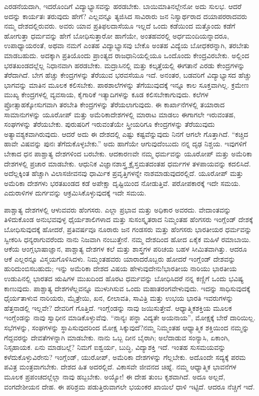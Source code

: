 ಎರಡನೆಯದಾಗಿ, ಇದರೊಂದಿಗೆ ವಿದ್ಯಾಭ್ಯಾಸವನ್ನು ಹರಡಬೇಕು. ಬಾಯಿಮಾತಿನಲ್ಲೇನೋ ಅದು ಸುಲಭ. ಆದರೆ ಅದನ್ನು ಕಾರ್ಯತಃ ತರುವುದು ಹೇಗೆ? ಎಲ್ಲವನ್ನೂ ತ್ಯಜಿಸಿದ ಸಾವಿರಾರು ಜನ ನಿಸ್ವಾರ್ಥರಾದ ದಯಾಪರರಾದವರು ನಮ್ಮ ದೇಶದಲ್ಲಿರುವರು. ಅವರು ಯಾವ ಪ್ರತಿಫಲದಾಸೆಯೂ ಇಲ್ಲದೆ ಒಂದು ಕಡೆಯಿಂದ ಮತ್ತೊಂದು ಕಡೆಗೆ ಹೋಗುತ್ತಾ ಧರ್ಮವನ್ನು ಹೇಗೆ ಬೋಧಿಸುತ್ತಾರೋ ಹಾಗೆಯೇ, ಅಂತಹವರಲ್ಲಿ ಅರ್ಧಮಂದಿಯನ್ನಾದರೂ, ಉಪಾಧ್ಯಾಯರಂತೆ, ಅಥವಾ ನಮಗೆ ಎಂತಹ ವಿದ್ಯಾಭ್ಯಾಸವು ಬೇಕೊ ಅಂತಹ ವಿದ್ಯೆಯ ಬೋಧಕರನ್ನಾಗಿ, ತರಬೇತು ಮಾಡಬಹುದು. ಅದಕ್ಕಾಗಿ ಪ್ರತಿಯೊಂದು ಪ್ರಾಂತ್ಯದ ರಾಜಧಾನಿಯಲ್ಲಿಯೂ ಒಂದೊಂದು ಕೇಂದ್ರವಿರಬೇಕು. ಅಲ್ಲಿಂದ ಭರತಖಂಡದಲ್ಲೆಲ್ಲ ನಿಧಾನವಾಗಿ ಹರಡಬೇಕು. ಮದ್ರಾಸಿನಲ್ಲಿ ಮತ್ತು ಕಲ್ಕತ್ತೆಯಲ್ಲಿ ಈಗತಾನೆ ಎರಡು ಕೇಂದ್ರಗಳನ್ನು ತೆರೆದಾಗಿದೆ. ಬೇಗ ಹೆಚ್ಚು ಕೇಂದ್ರಗಳನ್ನು ತೆರೆಯುವ ಭರವಸೆಯೂ ಇದೆ. ಅನಂತರ, ಬಡವರಿಗೆ ವಿದ್ಯಾಭ್ಯಾಸದ ಹೆಚ್ಚು ಭಾಗವನ್ನು ಮಾತಿನ ಮೂಲಕ ಕಲಿಸಬೇಕು. ಪಾಠಶಾಲೆಗಳನ್ನು ತೆಗೆಯುವುದಕ್ಕೆ ಇನ್ನೂ ಕಾಲ ಸೂಕ್ತವಾಗಿಲ್ಲ. ಕ್ರಮೇಣ ಮುಖ್ಯ ಕೇಂದ್ರಗಳಲ್ಲಿ ವ್ಯವಸಾಯ, ಕೈಗಾರಿಕೆ ಇತ್ಯಾದಿಗಳನ್ನು ಕೂಡ ಕಲಿಸಬೇಕಾಗುವುದು. ಕಲೆಗಳ ಪ್ರೋತ್ಸಾಹಕ್ಕೋಸುಗವಾಗಿ ತರಬೇತಿ ಕೇಂದ್ರಗಳನ್ನು ತೆರೆಯಲಾಗುವುದು. ಈ ಕಾರ್ಖಾನೆಗಳಲ್ಲಿ ತಯಾರಾದ ಸಾಮಾನುಗಳನ್ನು ಯೂರೋಪ್ ಮತ್ತು ಅಮೆರಿಕಾದೇಶಗಳಲ್ಲಿ ಮಾರಾಟ ಮಾಡಲು ಈಗಾಗಲೇ ಇರುವಂತಹ, ಸಂಘಗಳನ್ನು ತೆರೆಯಬೇಕು. ಪುರುಷರಿಗೆ ಇರುವಂತೆಯೇ ಸ್ತ್ರೀಯರಿಗೂ ಕೇಂದ್ರಗಳನ್ನು ತೆರೆಯುವುದು ಅತ್ಯಾವಶ್ಯಕವಾಗಿರುವುದು. ಆದರೆ ಅದು ಈ ದೇಶದಲ್ಲಿ ಎಷ್ಟು ಕಷ್ಟವೆನ್ನುವುದು ನಿನಗೆ ಆಗಲೇ ಗೊತ್ತಾಗಿದೆ. “ಕಚ್ಚಿದ ಹಾವೇ ವಿಷವನ್ನು ಪುನಃ ತೆಗೆದುಕೊಳ್ಳಬೇಕು.” ಅದು ಹಾಗೆಯೇ ಆಗುವುದೆಂಬುದು ನನ್ನ ದೃಢ ನಿಶ್ಚಯ. ಇವುಗಳಿಗೆ ಬೇಕಾದ ಧನ ಪಾಶ್ಚಾತ್ಯ ದೇಶಗಳಿಂದ ಬರಬೇಕು. ಆದಕಾರಣವೇ ನಮ್ಮ ಧರ್ಮವನ್ನು ಯೂರೋಪ್ ಮತ್ತು ಅಮೆರಿಕಾ ದೇಶಗಳಲ್ಲಿ ಪ್ರಚಾರ ಮಾಡಬೇಕು. ಆಧುನಿಕ ವಿಜ್ಞಾನಶಾಸ್ತ್ರ ಕ್ರೈಸ್ತಮತದಂತಹ ಧರ್ಮಗಳ ತಳಪಾಯವನ್ನು ಕದಲಿಸಿದೆ. ಅದೆಲ್ಲಕ್ಕಿಂತ ಹೆಚ್ಚಾಗಿ ವಿಲಾಸಜೀವನವು ಧಾರ್ಮಿಕ ಪ್ರವೃತ್ತಿಗಳನ್ನೇ ನಾಶಮಾಡುವುದರಲ್ಲಿದೆ. ಯೂರೋಪ್ ಮತ್ತು ಅಮೆರಿಕಾ ದೇಶಗಳು ಭರತಖಂಡದ ಕಡೆ ಅಪೇಕ್ಷಾ ದೃಷ್ಟಿಯಿಂದ ನೋಡುತ್ತಿವೆ. ಪರೋಪಕಾರಕ್ಕೆ ಇದೇ ಸಮಯ. ಎದುರಾಳಿಗಳ ದುರ್ಗವನ್ನು ಆಕ್ರಮಿಸಿಕೊಳ್ಳುವುದಕ್ಕೆ ಇದೇ ಸಮಯ.

ಪಾಶ್ಚಾತ್ಯ ದೇಶಗಳಲ್ಲಿ ಆಳುವವರು ಹೆಂಗಸರು. ಎಲ್ಲಾ ಪ್ರಭಾವ ಮತ್ತು ಅಧಿಕಾರ ಅವರದು. ವೇದಾಂತವನ್ನು ತಿಳಿದುಕೊಂಡ ಅನುಭವವುಳ್ಳ ಧೈರ್ಯಶಾಲಿಗಳಾದ ಮತ್ತು ಸುಸಂಸ್ಕೃತರಾದ ನಿಮ್ಮಂತಹ ಹೆಂಗಸರು ಇಂಗ್ಲೆಂಡ್ ದೇಶಕ್ಕೆ ಬೋಧಿಸುವುದಕ್ಕೆ ಹೋದರೆ, ಪ್ರತಿವರ್ಷವೂ ನೂರಾರು ಜನ ಗಂಡಸರು ಮತ್ತು ಹೆಂಗಸರು ಭಾರತೀಯರ ಧರ್ಮವನ್ನು ಸ್ವೀಕರಿಸಿ ಧನ್ಯರಾಗುವರೆಂದು ನಾನು ನಿಜವಾಗಿ ನಂಬುತ್ತೇನೆ. ನಮ್ಮ ದೇಶದಿಂದ ಹೋದ ಏಕೈಕ ಮಹಿಳೆ ರಮಾಬಾಯಿ. ಆಕೆಯ ಆಂಗ್ಲಭಾಷಾಜ್ಞಾನ, ಪಾಶ್ಚಾತ್ಯ ದೇಶಗಳ ಕಲೆ ಮತ್ತು ಶಾಸ್ತ್ರಗಳ ಪರಿಚಯ ಬಹಳ ಸೀಮಿತವಾಗಿತ್ತು. ಆದರೂ ಆಕೆ ಎಲ್ಲರನ್ನೂ ವಿಸ್ಮಯಗೊಳಿಸಿದಳು. ನಿಮ್ಮಂತಹವರು ಯಾರಾದರೊಬ್ಬರು ಹೋದರೆ ಇಂಗ್ಲೆಂಡ್ ದೇಶವನ್ನು ಹುರಿದುಂಬಿಸಬಹುದು; ಇನ್ನು ಅಮೆರಿಕಾ ದೇಶದ ವಿಷಯ ಹೇಳುವುದೇನು!ಭಾರತೀಯ ನಾರಿಯು ಭಾರತೀಯ ಉಡುಪಿನಲ್ಲಿ ಭಾರತದ ಋಷಿಗಳ ಮುಖದಿಂದ ಹೊರಟ ಧರ್ಮವನ್ನು ಬೋಧಿಸಿದರೆ\enginline{-} ನನ್ನ ಕಣ್ಣಿಗೆ ಒಂದು ಭವಿಷ್ಯ ಕಾಣುವುದು. ಪಾಶ್ಚಾತ್ಯ ದೇಶಗಳೆಲ್ಲವನ್ನೂ ಮುಳುಗಿಸುವ ಒಂದು ಮಹಾತರಂಗವೇಳುವುದು. ಇದನ್ನು ಸಾಧಿಸುವುದಕ್ಕೆ ಧೈರ್ಯತಾಳುವ ನಾರಿಯರು, ಮೈತ್ರೇಯಿ, ಖನ, ಲೀಲಾವತಿ, ಸಾವಿತ್ರಿ ಮತ್ತು ಉಭಯ ಭಾರತಿ ಇವರುಗಳನ್ನು ಹೆತ್ತನಾಡಲ್ಲಿ ಇಲ್ಲವೇ? ದೇವರಿಗೆ ಗೊತ್ತಿದೆ. ಇಂಗ್ಲೆಂಡನ್ನು ನಾವು ಜಯಿಸುತ್ತೇವೆ. ಆಧ್ಯಾತ್ಮಿಕಶಕ್ತಿಯ ಮೂಲಕ ಇಂಗ್ಲೆಂಡನ್ನು ನಾವು ಸ್ವಾಧೀನ ಮಾಡಿಕೊಳ್ಳುವೆವು. “ನಾನ್ಯಃ ಪನ್ಥಾ ವಿದ್ಯತೇ ಅಯನಾಯ”, ಮೋಕ್ಷಕ್ಕೆ ಬೇರೆ ದಾರಿಯಿಲ್ಲ. ಸಭೆಗಳನ್ನು, ಸಂಘಗಳನ್ನು ಸ್ಥಾಪಿಸುವುದರಿಂದ ಮೋಕ್ಷ ಸಿಕ್ಕುವುದೆ?ನಮ್ಮ ನಿಮ್ಮಂತಹ ಆಧ್ಯಾತ್ಮಿಕ ಶಕ್ತಿಯಿಂದ ನಮ್ಮನ್ನು ಗೆದ್ದವರನ್ನು ದೇವತೆಗಳನ್ನಾಗಿ ಮಾಡಬೇಕು. ನಾನು ಒಬ್ಬ ದೀನ ಬೈರಾಗಿ; ಅಲೆದಾಡುವ ಸಂನ್ಯಾಸಿ, ಏಕಾಂಗಿ, ನಿಸ್ಸಹಾಯಕ. ಏನು ಮಾಡಬಲ್ಲೆ? ನಿಮಗೆ ಐಶ್ವರ್ಯ, ಬುದ್ಧಿ, ವಿದ್ಯಾಶಕ್ತಿ ಇದೆ. ಇಂತಹ ಸುಸಮಯವನ್ನು ಕಳೆದುಕೊಳ್ಳುವಿರೇನು? ಇಂಗ್ಲೆಂಡ್, ಯುರೋಪ್, ಅಮೆರಿಕಾ ದೇಶಗಳನ್ನು ಗೆಲ್ಲಬೇಕು. ಅದೊಂದೇ ಸದ್ಯಕ್ಕೆ ಪರಮ ಪವಿತ್ರ ಮಂತ್ರವಾಗಬೇಕು. ದೇಶದ ಹಿತ ಅದರಲ್ಲಿದೆ. ವಿಕಾಸವೇ ಜೀವನದ ಚಿಹ್ನೆ. ನಮ್ಮ ಆಧ್ಯಾತ್ಮಿಕ ಭಾವನೆಗಳ ಮೂಲಕ ಪ್ರಪಂಚದಲ್ಲೆಲ್ಲಾ ನಾವು ಹಬ್ಬಬೇಕು. ಅಯ್ಯೋ! ಈ ದೇಹ ತುಂಬ ಕೃಶವಾಗಿದೆ. ಅದೂ ಅಲ್ಲದೆ, ವಂಗದೇಶೀಯನ ದೇಹ. ಈ ಪರಿಶ್ರಮ ಪಡುತ್ತಿರುವಾಗಲೇ ಭಯಂಕರ ಖಾಯಿಲೆ ಧಾಳಿ ಇಟ್ಟಿದೆ. ಆದರೂ ನೆಚ್ಚಿಗೆ ಇದೆ.


